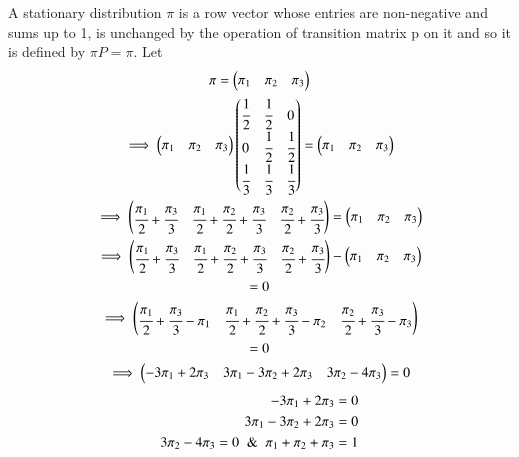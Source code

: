 \begin{enumerate}
A stationary distribution $\pi$ is a row vector whose entries are non-negative and sums up to 1, is unchanged by the operation of transition matrix p on it and so it is defined by $\pi P = \pi$.
Let
\begin{multline}
    \pi=\begin{pmatrix}\pi_{1}&\pi_{2}&\pi_{3}\end{pmatrix}
\\
    \implies \begin{pmatrix}\pi_{1}&\pi_{2}&\pi_{3}\end{pmatrix}\begin{pmatrix}\cfrac{1}{2}&\cfrac{1}{2}&0\\0&\cfrac{1}{2}&\cfrac{1}{2}\\\cfrac{1}{3}&\cfrac{1}{3}&\cfrac{1}{3}\end{pmatrix} = \begin{pmatrix}\pi_{1}&\pi_{2}&\pi_{3}\end{pmatrix}
\\
    \implies \begin{pmatrix} \cfrac{\pi_{1}}{2}+\cfrac{\pi_{3}}{3}& \cfrac{\pi_{1}}{2}+\cfrac{\pi_{2}}{2}+\cfrac{\pi_{3}}{3}&\cfrac{\pi_{2}}{2}+\cfrac{\pi_{3}}{3}\end{pmatrix}=\begin{pmatrix}\pi_{1}&\pi_{2}&\pi_{3}\end{pmatrix}
\\
    \implies \begin{pmatrix} \cfrac{\pi_{1}}{2}+\cfrac{\pi_{3}}{3}& \cfrac{\pi_{1}}{2}+\cfrac{\pi_{2}}{2}+\cfrac{\pi_{3}}{3}&\cfrac{\pi_{2}}{2}+\cfrac{\pi_{3}}{3}\end{pmatrix}-\begin{pmatrix}\pi_{1}&\pi_{2}&\pi_{3}\end{pmatrix}
\\
    =0
\\
    \implies\begin{pmatrix}\cfrac{\pi_{1}}{2}+\cfrac{\pi_{3}}{3}-\pi_{1}& \cfrac{\pi_{1}}{2}+\cfrac{\pi_{2}}{2}+\cfrac{\pi_{3}}{3}-\pi_{2}&\cfrac{\pi_{2}}{2}+\cfrac{\pi_{3}}{3}-\pi_{3}\end{pmatrix}
\\
    =0
\\
    \implies \begin{pmatrix}-3\pi_{1}+2\pi_{3}&3\pi_{1}-3\pi_{2}+2\pi_{3}&3\pi_{2}-4\pi_{3}\end{pmatrix}=0
\end{multline}
\begin{align}
    -3\pi_{1}+2\pi_{3}=0 
\\
     3\pi_{1}-3\pi_{2}+2\pi_{3}=0 
\\
     3\pi_{2}-4\pi_{3} =0 \And \pi_{1}+\pi_{2}+\pi_{3}=1 
\end{align}


\end{enumerate}
